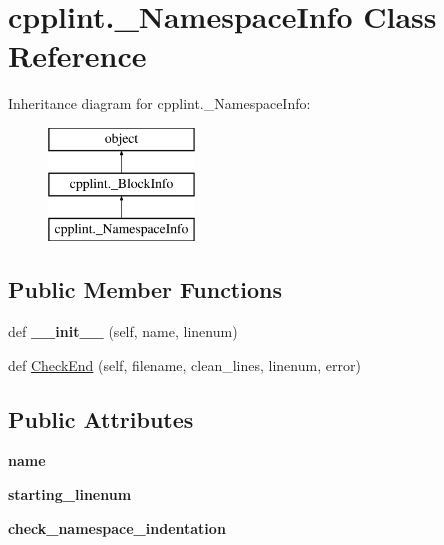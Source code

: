 \hypertarget{classcpplint_1_1__NamespaceInfo}{}\section{cpplint.\+\_\+\+Namespace\+Info Class Reference}
\label{classcpplint_1_1__NamespaceInfo}
Inheritance diagram for cpplint.\+\_\+\+Namespace\+Info\+:\begin{figure}[H]
\begin{center}
\leavevmode
\includegraphics[height=3.000000cm]{classcpplint_1_1__NamespaceInfo}
\end{center}
\end{figure}
\subsection*{Public Member Functions}
\begin{DoxyCompactItemize}
\item 
def {\bfseries \+\_\+\+\_\+init\+\_\+\+\_\+} (self, name, linenum)\hypertarget{classcpplint_1_1__NamespaceInfo_a4425c93bd90fbf869dc31c87302f5bb0}{}\label{classcpplint_1_1__NamespaceInfo_a4425c93bd90fbf869dc31c87302f5bb0}

\item 
def \hyperlink{classcpplint_1_1__NamespaceInfo_a9d3abaeed0353942ca689eeeb2f2924b}{Check\+End} (self, filename, clean\+\_\+lines, linenum, error)
\end{DoxyCompactItemize}
\subsection*{Public Attributes}
\begin{DoxyCompactItemize}
\item 
{\bfseries name}\hypertarget{classcpplint_1_1__NamespaceInfo_a6b518dae822e4e440405654e83dc86a1}{}\label{classcpplint_1_1__NamespaceInfo_a6b518dae822e4e440405654e83dc86a1}

\item 
{\bfseries starting\+\_\+linenum}\hypertarget{classcpplint_1_1__NamespaceInfo_a1053c0f6e43847a24774ace88b9f5719}{}\label{classcpplint_1_1__NamespaceInfo_a1053c0f6e43847a24774ace88b9f5719}

\item 
{\bfseries check\+\_\+namespace\+\_\+indentation}\hypertarget{classcpplint_1_1__NamespaceInfo_ae0b0b6ffafd3336a93cddca1078df268}{}\label{classcpplint_1_1__NamespaceInfo_ae0b0b6ffafd3336a93cddca1078df268}

\end{DoxyCompactItemize}


